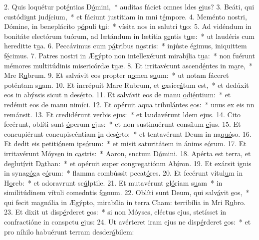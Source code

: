 2. Quis loquétur pot\uline{é}ntias D\uline{ó}mini,~* audítas fáciet omnes ldes \uline{e}jus?
3. Beáti, qui custódi\uline{u}nt jud\uline{í}cium,~* et fáciunt justítiam in mni t\uline{é}mpore.
4. Meménto nostri, Dómine, in beneplácito p\uline{ó}puli t\uline{u}i:~* vísita nos in salutri t\uline{u}o:
5. Ad vidéndum in bonitáte electórum tuórum, ad lætándum in lætítia g\uline{e}ntis t\uline{u}æ:~* ut laudéris cum hereditte t\uline{u}a.
6. Peccávimus cum p\uline{á}tribus n\uline{o}stris:~* injúste égimus, iniquittem f\uline{é}cimus.
7. Patres nostri in Ægýpto non intellexérunt mirab\uline{í}lia t\uline{u}a:~* non fuérunt mémores multitúdinis misericórdæ t\uline{u}æ.
8. Et irritavérunt ascend\uline{é}ntes in m\uline{a}re,~* Mre R\uline{u}brum.
9. Et salvávit eos propter n\uline{o}men s\uline{u}um:~* ut notam fáceret poténtam s\uline{u}am.
10. Et incrépuit Mare Rubrum, et \uline{e}xsicc\uline{á}tum est,~* et dedúxit eos in abýssis sicut n des\uline{é}rto.
11. Et salvávit eos de manu \uline{o}di\uline{é}ntium:~* et redémit eos de manu nim\uline{í}ci.
12. Et opéruit aqua tribul\uline{á}ntes \uline{e}os:~* unus ex eis nn rem\uline{á}nsit.
13. Et credidérunt v\uline{e}rbis \uline{e}jus:~* et laudavérunt ldem \uline{e}jus.
14. Cito fecérunt, oblíti sunt \uline{ó}perum \uline{e}jus:~* et non sustinuérunt consílum \uline{e}jus.
15. Et concupiérunt concupiscéntiam \uline{i}n des\uline{é}rto:~* et tentavérunt Deum in na\uline{quó}so.
16. Et dedit eis petiti\uline{ó}nem ips\uline{ó}rum:~* et misit saturitátem in ánims e\uline{ó}rum.
17. Et irritavérunt Móys\uline{e}n in c\uline{a}stris:~* Aaron, snctum D\uline{ó}mini.
18. Apérta est terra, et deglut\uline{í}vit D\uline{a}than:~* et opéruit super congregatiónm Ab\uline{í}ron.
19. Et exársit ignis in synag\uline{ó}ga e\uline{ó}rum:~* flamma combússit pccat\uline{ó}res.
20. Et fecérunt vítul\uline{u}m in H\uline{o}reb:~* et adoravrunt sc\uline{ú}lptile.
21. Et mutavérunt gl\uline{ó}riam s\uline{u}am~* in similitúdinem vítuli comedntis f\uline{œ}num.
22. Oblíti sunt Deum, qui salv\uline{á}vit \uline{e}os,~* qui fecit magnália in Ægýpto, mirabília in terra Cham: terribília in Mri R\uline{u}bro.
23. Et dixit ut disp\uline{é}rderet \uline{e}os:~* si non Móyses, eléctus ejus, stetísset in confractióne in conspctu \uline{e}jus:
24. Ut avérteret iram ejus ne disp\uline{é}rderet \uline{e}os:~* et pro níhilo habuérunt terram desder\uline{á}bilem:
